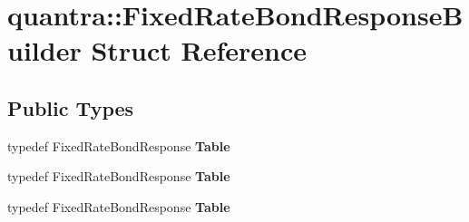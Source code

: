 \hypertarget{structquantra_1_1FixedRateBondResponseBuilder}{}\section{quantra\+:\+:Fixed\+Rate\+Bond\+Response\+Builder Struct Reference}
\label{structquantra_1_1FixedRateBondResponseBuilder}
\subsection*{Public Types}
\begin{DoxyCompactItemize}
\item 
\mbox{\label{structquantra_1_1FixedRateBondResponseBuilder_a1f78fa983e6861d573bddb9b6dad850b}} 
typedef Fixed\+Rate\+Bond\+Response {\bfseries Table}
\item 
\mbox{\label{structquantra_1_1FixedRateBondResponseBuilder_a1f78fa983e6861d573bddb9b6dad850b}} 
typedef Fixed\+Rate\+Bond\+Response {\bfseries Table}
\item 
\mbox{\label{structquantra_1_1FixedRateBondResponseBuilder_a1f78fa983e6861d573bddb9b6dad850b}} 
typedef Fixed\+Rate\+Bond\+Response {\bfseries Table}
\end{DoxyCompactItemize}
